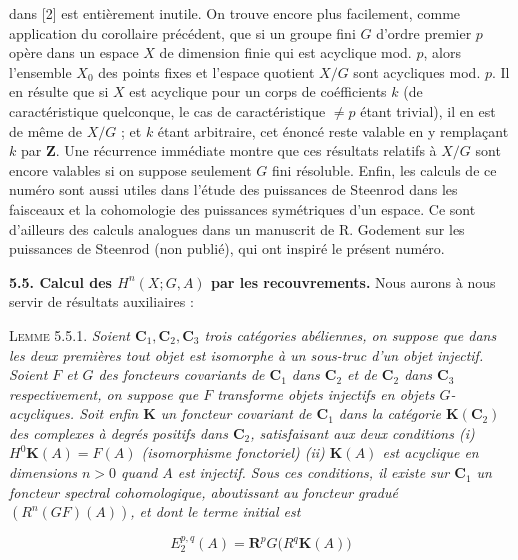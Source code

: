 \clearpage
{}

\noindent dans [2] est entièrement inutile. On trouve encore plus facilement,
comme application du corollaire précédent, que si un groupe fini $G$ d'ordre
premier $p$ opère dans un espace $X$ de dimension finie qui est acyclique mod.
$p$, alors l'ensemble $X_0$ des points fixes et l'espace quotient $X/G$ sont
acycliques mod. $p$. Il en résulte que si $X$ est acyclique pour un corps de
coéfficients $k$ (de caractéristique quelconque, le cas de caractéristique
$\ne p$ étant trivial), il en est de même de $X/G$ ; et $k$ étant arbitraire,
cet énoncé reste valable en y remplaçant $k$ par $\mathbf Z$. Une récurrence
immédiate montre que ces résultats relatifs à $X/G$ sont encore valables si on
suppose seulement $G$ fini résoluble. Enfin, les calculs de ce numéro sont
aussi utiles dans l'étude des puissances de Steenrod dans les faisceaux et la
cohomologie des puissances symétriques d'un espace. Ce sont d'ailleurs des
calculs analogues dans un manuscrit de R. Godement sur les puissances de
Steenrod (non publié), qui ont inspiré le présent numéro.

\bigskip
\textbf{5.5. Calcul des $H^n(X;G,A)$ par les recouvrements.} Nous
aurons à nous servir de résultats auxiliaires :

\textsc{Lemme 5.5.1.} \textit{Soient ${\mathbf C}_1,{\mathbf C}_2,{\mathbf C}_3$ trois catégories
abéliennes, on suppose que dans les deux premières tout objet est isomorphe à
un sous-truc d'un objet injectif. Soient $F$ et $G$ des foncteurs covariants de
${\mathbf C}_1$ dans ${\mathbf C}_2$ et de ${\mathbf C}_2$ dans ${\mathbf C}_3$ respectivement, on suppose que $F$
transforme objets injectifs en objets $G$-acycliques. Soit enfin $\mathbf K$ un
foncteur covariant de ${\mathbf C}_1$ dans la catégorie $\mathbf K({\mathbf C}_2)$ des complexes à
degrés positifs dans ${\mathbf C}_2$, satisfaisant aux deux conditions \textup{(i)}
$H^0\mathbf K(A)=F(A)$ (isomorphisme fonctoriel) \textup{(ii)} $\mathbf K(A)$ est
acyclique en dimensions $n>0$ quand $A$ est injectif. Sous ces conditions, il
existe sur ${\mathbf C}_1$ un foncteur spectral cohomologique, aboutissant au foncteur
gradué $(R^n(GF)(A))$, et dont le terme initial est}

\[
\tag{5.5.1}
E_2^{p,q}(A)={\mathbf R}^pG\bigl(R^q\mathbf K(A)\bigr)
\]

